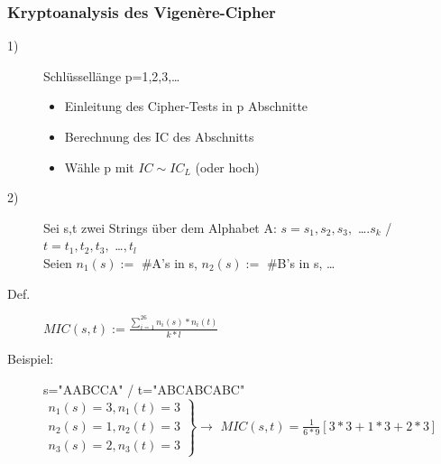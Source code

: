 \documentclass[landscape,twocolumn,a4paper]{article}
\newcommand{\ra}{\rightarrow}
\newcommand{\Brackar}[2]{\left.\begin{array}{#1} #2 \end{array}\right\rbrace} %
\begin{document}
\subsubsection{Kryptoanalysis des Vigen\`{e}re-Cipher}
\begin{description}
	\item[1)] Schlüssellänge p=1,2,3,\dots
		\begin{itemize}
			\item Einleitung des Cipher-Tests in p Abschnitte
			\item Berechnung des IC des Abschnitts
			\item Wähle p mit $IC\sim IC_L$ (oder hoch)
		\end{itemize}
	\item[2)] Sei s,t zwei  Strings über dem Alphabet A: $s=s_1,s_2,s_3,$ \dots$. s_k$ / $t=t_1,t_2,t_3,$ \dots$, t_l$ \\
		Seien $n_1(s) :=$ \#A's in s, $n_2(s) :=$ \#B's in s, \dots
	\item[Def.] $MIC(s,t):=\frac{\sum_{i=1}^{26}n_i(s)*n_i(t)}{k*l}$
	\item[Beispiel:] s="{}AABCCA" / t="{}ABCABCABC" \\
		$\Brackar{l}{ n_1(s)=3, n_1(t)=3 \\ n_2(s)=1, n_2(t)=3 \\ n_3(s)=2, n_3(t)=3} \ra$ $MIC(s,t)=\frac{1}{6*9}[3*3+1*3+2*3]$


\end{description}
\end{document}
